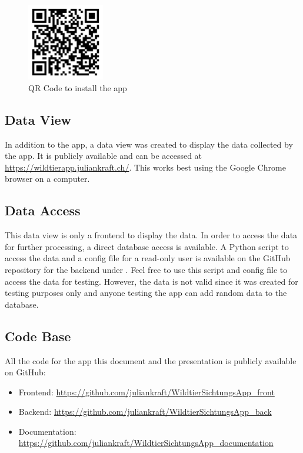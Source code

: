 \documentclass{josis}
\begin{document}
\begin{figure}[tbh]
    \centering
    \includegraphics[width=0.3\textwidth]{images/qr_code_app.png}
    \caption{QR Code to install the app}\label{fig:qr_code_app}
\end{figure}

\subsection{Data View}

In addition to the app, a data view was created to display the data collected by the app. It is publicly available and can be 
accessed at \url{https://wildtierapp.juliankraft.ch/}. This works best using the Google Chrome browser on a computer.

\subsection{Data Access}

This data view is only a frontend to display the data. In order to access the data for further processing, a direct database access is available.
A Python script to access the data and a config file for a read-only user is available on the GitHub repository 
for the backend under .
Feel free to use this script and config file to access the data for testing. However, the data is not valid since it was created for testing purposes only
and anyone testing the app can add random data to the database.

\subsection{Code Base}
All the code for the app this document and the presentation is publicly available on GitHub:
\begin{itemize}
    \item Frontend: \url{https://github.com/juliankraft/WildtierSichtungsApp_front}
    \item Backend: \url{https://github.com/juliankraft/WildtierSichtungsApp_back}
    \item Documentation: \url{https://github.com/juliankraft/WildtierSichtungsApp_documentation}
\end{itemize}
\end{document}
